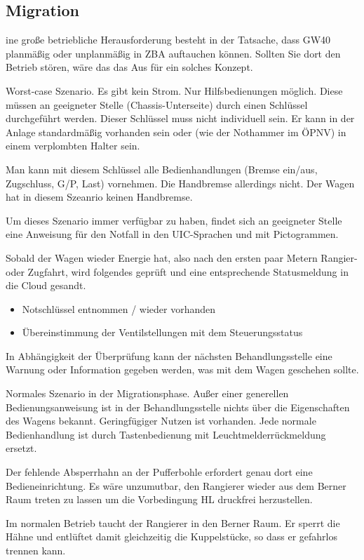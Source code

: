 \subsection{Migration}
ine große betriebliche Herausforderung besteht in der Tatsache, dass GW40 planmäßig oder unplanmäßig in ZBA auftauchen können. Sollten Sie dort den Betrieb stören, wäre das das Aus für ein solches Konzept.\par
Worst-case Szenario. Es gibt kein Strom. Nur Hilfsbedienungen möglich. Diese müssen an geeigneter Stelle (Chassis-Unterseite) durch einen Schlüssel durchgeführt werden. Dieser Schlüssel muss nicht individuell sein. Er kann in der Anlage standardmäßig vorhanden sein oder (wie der Nothammer im ÖPNV) in einem verplombten Halter sein.\par
Man kann mit diesem Schlüssel alle Bedienhandlungen (Bremse ein/aus, Zugschluss, G/P, Last) vornehmen. Die Handbremse allerdings nicht. Der Wagen hat in diesem Szeanrio keinen Handbremse.\par
Um dieses Szenario immer verfügbar zu haben, findet sich an geeigneter Stelle eine Anweisung für den Notfall in den UIC-Sprachen und mit Pictogrammen. \par
Sobald der Wagen wieder Energie hat, also nach den ersten paar Metern Rangier- oder Zugfahrt, wird folgendes geprüft und eine entsprechende Statusmeldung in die Cloud gesandt.
\begin{itemize}
\item Notschlüssel entnommen / wieder vorhanden
\item Übereinstimmung der Ventilstellungen mit dem Steuerungsstatus
\end{itemize}
In Abhängigkeit der Überprüfung kann der nächsten Behandlungsstelle eine Warnung oder Information gegeben werden, was mit dem Wagen geschehen sollte.\par
Normales Szenario in der Migrationsphase. Außer einer generellen Bedienungsanweisung ist in der Behandlungsstelle nichts über die Eigenschaften des Wagens bekannt. Geringfügiger Nutzen ist vorhanden. Jede normale Bedienhandlung ist durch Tastenbedienung mit Leuchtmelderrückmeldung ersetzt.\par
Der fehlende Absperrhahn an der Pufferbohle erfordert genau dort eine Bedieneinrichtung. Es wäre unzumutbar, den Rangierer wieder aus dem Berner Raum treten zu lassen um die Vorbedingung HL druckfrei herzustellen.\par
Im normalen Betrieb taucht der Rangierer in den Berner Raum. Er sperrt die Hähne und entlüftet damit gleichzeitig die Kuppelstücke, so dass er gefahrlos trennen kann.\par
